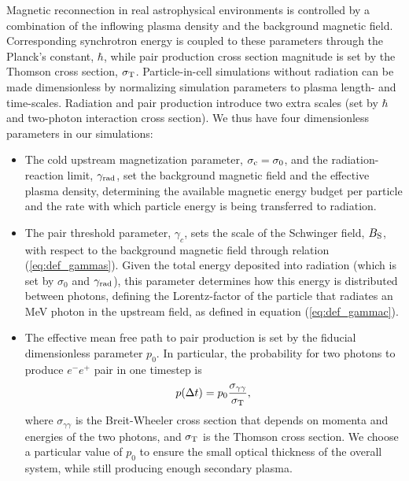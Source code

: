 Magnetic reconnection in real astrophysical environments is controlled by a combination of the inflowing plasma density and the background magnetic field. Corresponding synchrotron energy is coupled to these parameters through the Planck's constant, $\hbar$, while pair production cross section magnitude is set by the Thomson cross section, $\sigma_{\rm T}$. Particle-in-cell simulations without radiation can be made dimensionless by normalizing simulation parameters to plasma length- and time-scales. Radiation and pair production introduce two extra scales (set by $\hbar$ and two-photon interaction cross section). We thus have four dimensionless parameters in our simulations:
\begin{itemize}

    \item The cold upstream magnetization parameter, $\sigma_{\rm c} = \sigma_0$, and the radiation-reaction limit, $\gamma_{\rm rad}$, set the background magnetic field and the effective plasma density, determining the available magnetic energy budget per particle and the rate with which particle energy is being transferred to radiation.

    \item The pair threshold parameter, $\gamma_c$, sets the scale of the Schwinger field, $B_{\rm S}$, with respect to the background magnetic field through relation (\ref{eq:def_gammas}). Given the total energy deposited into radiation (which is set by $\sigma_0$ and $\gamma_{\rm rad}$), this parameter determines how this energy is distributed between photons, defining the Lorentz-factor of the particle that radiates an MeV photon in the upstream field, as defined in equation (\ref{eq:def_gammac}).

    \item The effective mean free path to pair production is set by the fiducial dimensionless parameter $p_0$. In particular, the probability for two photons to produce $e^-e^+$ pair in one timestep is
    \begin{equation}
        p(\Delta t)=p_0\frac{\sigma_{\gamma\gamma}}{\sigma_{\rm T}},
    \end{equation}
    where $\sigma_{\gamma\gamma}$ is the Breit-Wheeler cross section that depends on momenta and energies of the two photons, and $\sigma_{\rm T}$ is the Thomson cross section. We choose a particular value of $p_0$ to ensure the small optical thickness of the overall system, while still producing enough secondary plasma.
\end{itemize}


